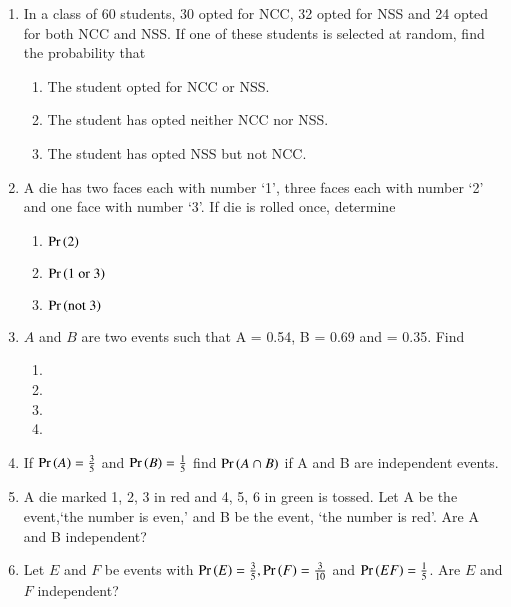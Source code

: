 \begin{enumerate}[label=\thesection.\arabic*,ref=\thesection.\theenumi]
	\\
	\solution

 \item In a class of 60 students, 30 opted for NCC, 32 opted for NSS and 24 
    opted for both NCC and NSS. If one of these students is selected at random, 
    find the probability that
    \begin{enumerate}
        \item The student opted for NCC or NSS.
        \item The student has opted neither NCC nor NSS.
        \item The student has opted NSS but not NCC.
    \end{enumerate}
	\solution

\item A die has two faces each with number ‘1’, three faces each with number ‘2’ and one face with number ‘3’. If die is rolled once, determine
\begin{enumerate}
\item $\Pr\left(2\right)$
\item $\Pr\left(1 \text{ or } 3\right)$
\item $\Pr\left(\text{not } 3\right)$
\end{enumerate}
		\solution

%
\item $A$ and $B$ are two events such that \pr A = 0.54, \pr B = 0.69 and  = 0.35.
%
Find \begin{enumerate}
\item {}
\item {}
\item {}
\item {} 
\end{enumerate} 
		\solution

\item If $\Pr\left(A\right) = \frac{3}{5}$ and $\Pr\left(B\right) = \frac{1}{5}$ find $\Pr\left(A \cap B\right)$ if A and B are independent events.
	\\
\solution

%
\item A die marked 1, 2, 3 in red and 4, 5, 6 in green is tossed. Let A be the event,‘the number is even,’ and B be the event, ‘the number is red’. Are A and B independent?
	\\
\solution

\item   Let $E$ and $F$ be events with $\Pr\left(E\right)=\frac{3}{5}, \Pr\left(F\right)=\frac{3}{10}$ and $\Pr\left(E F\right)=\frac{1}{5}$. Are $E$ and $F$ independent?
	\\

\end{enumerate}
